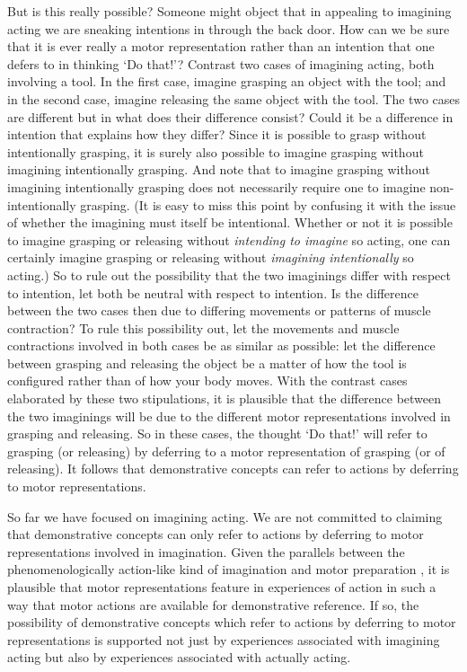 \documentclass[12pt,\papersize]{extarticle}
\begin{document}
But is this really possible? Someone might object that in appealing to imagining acting we are sneaking intentions in through the back door. How can we be sure that it is ever really a motor representation rather than an intention that one defers to in thinking `Do that!'?  Contrast two cases of imagining acting, both involving a tool. In the first case, imagine grasping an object with the tool; and in the second case, imagine releasing the same object with the tool. The two cases are different but in what does their difference consist? Could it be a difference in intention that explains how they differ?  Since it is possible to grasp without intentionally grasping, it is surely also possible to imagine grasping without imagining intentionally grasping.  And note that to imagine grasping without imagining intentionally grasping does not necessarily require one to imagine non-intentionally grasping. (It is easy to miss this point by confusing it with the issue of whether the imagining must itself be intentional. Whether or not it is possible to imagine grasping or releasing without \emph{intending to imagine} so acting, one can certainly imagine grasping or releasing without \emph{imagining intentionally} so acting.) So to rule out the possibility that the two imaginings differ with respect to intention, let both be neutral with respect to intention. Is the difference between the two cases then due to differing movements or patterns of muscle contraction? To rule this possibility out, let the movements and muscle contractions involved in both cases be as similar as possible: let the difference between grasping and releasing the object be a matter of how the tool is configured rather than of how your body moves. With the contrast cases elaborated by these two stipulations, it is plausible that the difference between the two imaginings will be due to the different motor representations involved in grasping and releasing. So in these cases, the thought `Do that!' will refer to grasping (or releasing) by deferring to a motor representation of grasping (or of releasing). It follows that demonstrative concepts can refer to actions by deferring to motor representations.

So far we have focused on imagining acting. We are not committed to claiming that demonstrative concepts can only refer to actions by deferring to motor representations involved in imagination. Given the parallels between the phenomenologically action-like kind of imagination and motor preparation \citep{Jeannerod:2001yb}, it is plausible that motor representations feature in experiences of action in such a way that motor actions are available for demonstrative reference. If so, the possibility of demonstrative concepts which refer to actions by deferring to motor representations is supported not just by experiences associated with imagining acting but also by experiences associated with actually acting.
\end{document}

